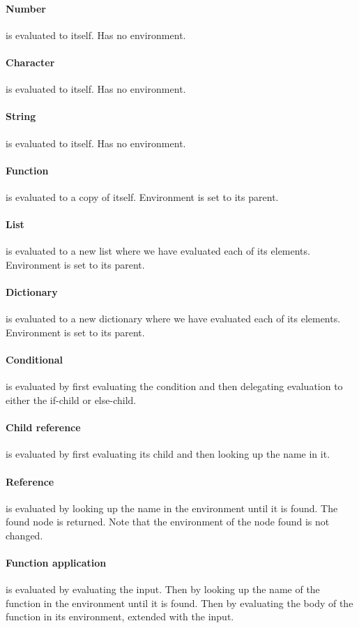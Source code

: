 \documentclass[a4paper,12pt]{article}
\begin{document}
\paragraph{Number} is evaluated to itself. Has no environment.
\paragraph{Character} is evaluated to itself. Has no environment.
\paragraph{String} is evaluated to itself. Has no environment.
\paragraph{Function} is evaluated to a copy of itself. Environment is set to its parent.
\paragraph{List} is evaluated to a new list where we have evaluated each of its elements. Environment is set to its parent.
\paragraph{Dictionary} is evaluated to a new dictionary where we have evaluated each of its elements. Environment is set to its parent.
\paragraph{Conditional} is evaluated by first evaluating the condition and then delegating evaluation to either the if-child or else-child.
\paragraph{Child reference} is evaluated by first evaluating its child and then looking up the name in it.
\paragraph{Reference} is evaluated by looking up the name in the environment until it is found. The found node is returned. Note that the environment of the node found is not changed.
\paragraph{Function application} is evaluated by evaluating the input. Then by looking up the name of the function in the environment until it is found. Then by evaluating the body of the function in its environment, extended with the input.
\end{document}
